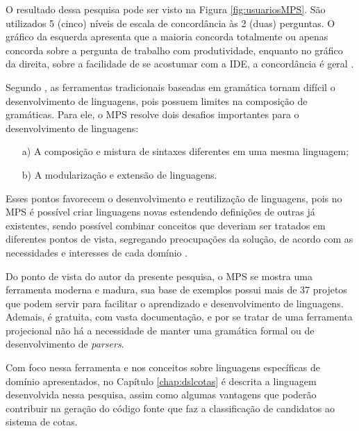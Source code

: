 O resultado dessa pesquisa pode ser visto na Figura \ref{fig:usuariosMPS}. São utilizados 5 (cinco) níveis de escala de concordância às 2 (duas) perguntas. O gráfico da esquerda apresenta que a maioria concorda totalmente ou apenas concorda sobre a pergunta de trabalho com produtividade, enquanto no gráfico da direita, sobre a facilidade de se acostumar com a \gls{IDE}, a concordância é geral \cite{voelter2014generic}.



Segundo , as ferramentas tradicionais baseadas em gramática tornam difícil o desenvolvimento de linguagens, pois possuem limites na composição de gramáticas. Para ele, o \gls{MPS} resolve dois desafios importantes para o desenvolvimento de linguagens: 
\begin{enumerate}
    \item[a)] A composição e mistura de sintaxes diferentes em uma mesma linguagem;
    \item[b)] A modularização e extensão de linguagens.
\end{enumerate}

Esses pontos favorecem o desenvolvimento e reutilização de linguagens, pois no \gls{MPS} é possível criar linguagens novas estendendo definições de outras já existentes, sendo possível combinar conceitos que deveriam ser tratados em diferentes pontos de vista, segregando preocupações da solução, de acordo com as necessidades e interesses de cada domínio \cite{volter2011language}.

Do ponto de vista do autor da presente pesquisa, o \gls{MPS} se mostra uma ferramenta moderna e madura, sua base de exemplos possui mais de 37 projetos que podem servir para facilitar o aprendizado e desenvolvimento de linguagens. Ademais, é gratuita, com vasta documentação, e por se tratar de uma ferramenta projecional não há a necessidade de manter uma gramática formal ou de desenvolvimento de \textit{parsers}.

Com foco nessa ferramenta e nos conceitos sobre linguagens específicas de domínio apresentados, no Capítulo \ref{chap:dslcotas} é descrita a linguagem desenvolvida nessa pesquisa, assim como algumas vantagens que poderão contribuir na geração do código fonte que faz a classificação de candidatos ao sistema de cotas.